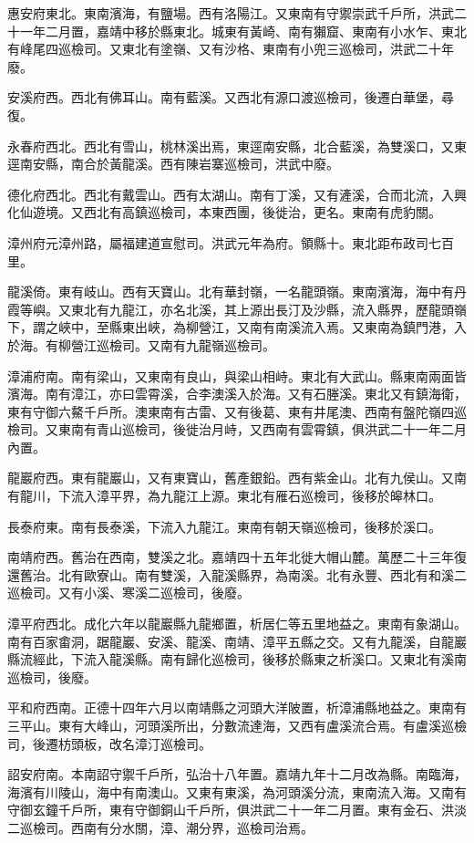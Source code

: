 惠安府東北。東南濱海，有鹽場。西有洛陽江。又東南有守禦崇武千戶所，洪武二十一年二月置，嘉靖中移於縣東北。城東有黃崎、南有獺窟、東南有小水乍、東北有峰尾四巡檢司。又東北有塗嶺、又有沙格、東南有小兜三巡檢司，洪武二十年廢。

安溪府西。西北有佛耳山。南有藍溪。又西北有源口渡巡檢司，後遷白華堡，尋復。

永春府西北。西北有雪山，桃林溪出焉，東逕南安縣，北合藍溪，為雙溪口，又東逕南安縣，南合於黃龍溪。西有陳岩寨巡檢司，洪武中廢。

德化府西北。西北有戴雲山。西有太湖山。南有丁溪，又有滻溪，合而北流，入興化仙遊境。又西北有高鎮巡檢司，本東西團，後徙治，更名。東南有虎豹關。

漳州府元漳州路，屬福建道宣慰司。洪武元年為府。領縣十。東北距布政司七百里。

龍溪倚。東有岐山。西有天寶山。北有華封嶺，一名龍頭嶺。東南濱海，海中有丹霞等嶼。又東北有九龍江，亦名北溪，其上源出長汀及沙縣，流入縣界，歷龍頭嶺下，謂之峽中，至縣東出峽，為柳營江，又南有南溪流入焉。又東南為鎮門港，入於海。有柳營江巡檢司。又南有九龍嶺巡檢司。

漳浦府南。南有梁山，又東南有良山，與梁山相峙。東北有大武山。縣東南兩面皆濱海。南有漳江，亦曰雲霄溪，合李澳溪入於海。又有石塍溪。東北又有鎮海衛，東有守御六鰲千戶所。澳東南有古雷、又有後葛、東有井尾澳、西南有盤陀嶺四巡檢司。又東南有青山巡檢司，後徙治月峙，又西南有雲霄鎮，俱洪武二十一年二月內置。

龍巖府西。東有龍巖山，又有東寶山，舊產銀鉛。西有紫金山。北有九侯山。又南有龍川，下流入漳平界，為九龍江上源。東北有雁石巡檢司，後移於皞林口。

長泰府東。南有長泰溪，下流入九龍江。東南有朝天嶺巡檢司，後移於溪口。

南靖府西。舊治在西南，雙溪之北。嘉靖四十五年北徙大帽山麓。萬歷二十三年復還舊治。北有歐寮山。南有雙溪，入龍溪縣界，為南溪。北有永豐、西北有和溪二巡檢司。又有小溪、寒溪二巡檢司，後廢。

漳平府西北。成化六年以龍巖縣九龍鄉置，析居仁等五里地益之。東南有象湖山。南有百家畬洞，踞龍巖、安溪、龍溪、南靖、漳平五縣之交。又有九龍溪，自龍巖縣流經此，下流入龍溪縣。南有歸化巡檢司，後移於縣東之析溪口。又東北有溪南巡檢司，後廢。

平和府西南。正德十四年六月以南靖縣之河頭大洋陂置，析漳浦縣地益之。東南有三平山。東有大峰山，河頭溪所出，分數流達海，又西有盧溪流合焉。有盧溪巡檢司，後遷枋頭板，改名漳汀巡檢司。

詔安府南。本南詔守禦千戶所，弘治十八年置。嘉靖九年十二月改為縣。南臨海，海濱有川陵山，海中有南澳山。又東有東溪，為河頭溪分流，東南流入海。又南有守御玄鐘千戶所，東有守御銅山千戶所，俱洪武二十一年二月置。東有金石、洪淡二巡檢司。西南有分水關，漳、潮分界，巡檢司治焉。

